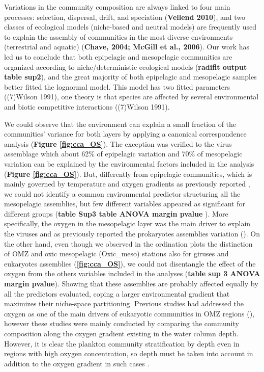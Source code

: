 \documentclass[fleqn,10pt]{wlscirep}
\begin{document}
Variations in the community composition are always linked to four main processes: selection, dispersal, drift, and speciation (\textbf{Vellend 2010}), and two classes of ecological models (niche-based and neutral models) are frequently used to explain the assembly of communities in the most diverse environments (terrestrial and aquatic) (\textbf{Chave, 2004; McGill et al., 2006}). Our work has led us to conclude that both epipelagic and mesopelagic communities are organized according to niche/deterministic ecological models (\textbf{radifit output table sup2}), and the great majority of both epipelagic and mesopelagic samples better fitted the lognormal model. This model has two fitted parameters ((7)Wilson 1991), one theory is that species are affected by several environmental and biotic competitive interactions ((7)Wilson 1991). 

We could observe that the environment can explain a small fraction of the communities’ variance for both layers by applying a canonical correspondence analysis (\textbf{Figure \ref{fig:cca_OS}}). The exception was verified to the virus assemblage which about 62\% of epipelagic variation and 70\% of mesopelagic variation can be explained by the environmental factors included in the analysis (\textbf{Figure \ref{fig:cca_OS}}). But, differently from epipelagic communities, which is mainly governed by temperature and oxygen gradients as previously reported \cite{sunagawa_structure_2015,gregory_marine_2019,ibarbalz_global_2019,giner_marked_2020, ghiglione_pole--pole_2012}, we could not identify a common environmental predictor structuring all the mesopelagic assemblies, but few different variables appeared as significant for different groups (\textbf{table Sup3 table ANOVA margin pvalue }). More specifically, the oxygen in the mesopelagic layer was the main driver to explain the viruses and as previously reported the prokaryotes assemblies variation (\cite{wright_microbial_2012, ulloa_pelagic_2013, aldunate_oxygen_2018}). On the other hand, even though we observed in the ordination plots the distinction of OMZ and oxic mesopelagic (Oxic\_meso) stations also for giruses and eukaryotes assemblies (\textbf{\ref{fig:cca_OS}}), we could not disentangle the effect of the oxygen from the others variables included in the analyses (\textbf{table sup 3 ANOVA margin pvalue}). Showing that these assemblies are probably affected equally by all the predictors evaluated, coping a larger environmental gradient that maximizes their niche-space partitioning. Previous studies had addressed the oxygen as one of the main drivers of eukaryotic communities in OMZ regions (\cite{de_la_iglesia_distinct_2020, orsi_effect_2012, parris_microbial_2014}), however these studies were mainly conducted by comparing the community composition along the oxygen gradient existing in the water column depth. However, it is clear the plankton community stratification by depth even in regions with high oxygen concentration, so depth must be taken into account in addition to the oxygen gradient in such cases \cite{schnetzer_depth_2011}.
\end{document}
